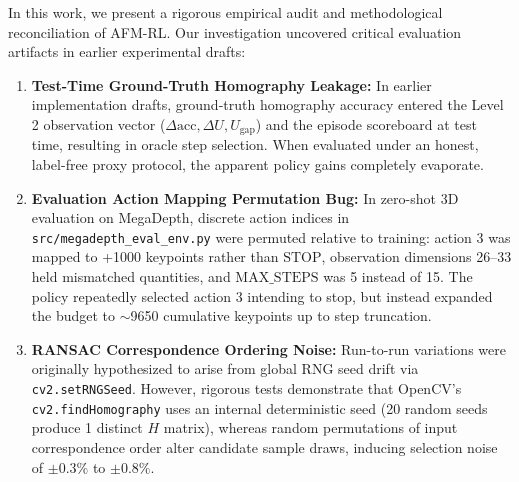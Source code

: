 \documentclass[conference]{IEEEtran}
\begin{document}
In this work, we present a rigorous empirical audit and methodological reconciliation of AFM-RL. Our investigation uncovered critical evaluation artifacts in earlier experimental drafts:
\begin{enumerate}
    \item \textbf{Test-Time Ground-Truth Homography Leakage:} In earlier implementation drafts, ground-truth homography accuracy entered the Level 2 observation vector ($\Delta\text{acc}, \Delta U, U_{\text{gap}}$) and the episode scoreboard at test time, resulting in oracle step selection. When evaluated under an honest, label-free proxy protocol, the apparent policy gains completely evaporate.
    \item \textbf{Evaluation Action Mapping Permutation Bug:} In zero-shot 3D evaluation on MegaDepth, discrete action indices in \texttt{src/megadepth\_eval\_env.py} were permuted relative to training: action 3 was mapped to +1000 keypoints rather than $\mathrm{STOP}$, observation dimensions 26--33 held mismatched quantities, and $\text{MAX\_STEPS}$ was 5 instead of 15. The policy repeatedly selected action 3 intending to stop, but instead expanded the budget to $\sim$9650 cumulative keypoints up to step truncation.
    \item \textbf{RANSAC Correspondence Ordering Noise:} Run-to-run variations were originally hypothesized to arise from global RNG seed drift via \texttt{cv2.setRNGSeed}. However, rigorous tests demonstrate that OpenCV's \texttt{cv2.findHomography} uses an internal deterministic seed (20 random seeds produce 1 distinct $H$ matrix), whereas random permutations of input correspondence order alter candidate sample draws, inducing selection noise of $\pm 0.3\%$ to $\pm 0.8\%$.
\end{enumerate}
\end{document}
